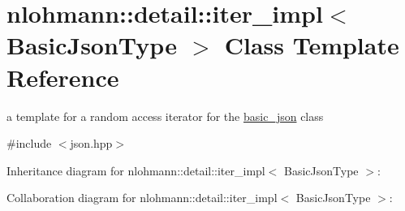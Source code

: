 \hypertarget{classnlohmann_1_1detail_1_1iter__impl}{}\section{nlohmann\+:\+:detail\+:\+:iter\+\_\+impl$<$ Basic\+Json\+Type $>$ Class Template Reference}
\label{classnlohmann_1_1detail_1_1iter__impl}


a template for a random access iterator for the \hyperlink{classnlohmann_1_1basic__json}{basic\+\_\+json} class  




{\ttfamily \#include $<$json.\+hpp$>$}



Inheritance diagram for nlohmann\+:\+:detail\+:\+:iter\+\_\+impl$<$ Basic\+Json\+Type $>$\+:


Collaboration diagram for nlohmann\+:\+:detail\+:\+:iter\+\_\+impl$<$ Basic\+Json\+Type $>$\+:
